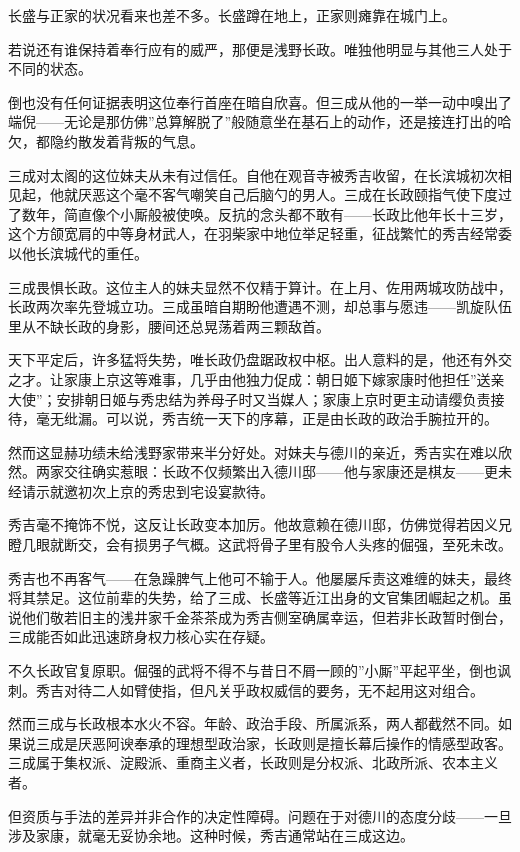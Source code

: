 \documentclass[
]{book}
\begin{document}
长盛与正家的状况看来也差不多。长盛蹲在地上，正家则瘫靠在城门上。

若说还有谁保持着奉行应有的威严，那便是浅野长政。唯独他明显与其他三人处于不同的状态。

倒也没有任何证据表明这位奉行首座在暗自欣喜。但三成从他的一举一动中嗅出了端倪------无论是那仿佛''总算解脱了''般随意坐在基石上的动作，还是接连打出的哈欠，都隐约散发着背叛的气息。

三成对太阁的这位妹夫从未有过信任。自他在观音寺被秀吉收留，在长滨城初次相见起，他就厌恶这个毫不客气嘲笑自己后脑勺的男人。三成在长政颐指气使下度过了数年，简直像个小厮般被使唤。反抗的念头都不敢有------长政比他年长十三岁，这个方颌宽肩的中等身材武人，在羽柴家中地位举足轻重，征战繁忙的秀吉经常委以他长滨城代的重任。

三成畏惧长政。这位主人的妹夫显然不仅精于算计。在上月、佐用两城攻防战中，长政两次率先登城立功。三成虽暗自期盼他遭遇不测，却总事与愿违------凯旋队伍里从不缺长政的身影，腰间还总晃荡着两三颗敌首。

天下平定后，许多猛将失势，唯长政仍盘踞政权中枢。出人意料的是，他还有外交之才。让家康上京这等难事，几乎由他独力促成：朝日姬下嫁家康时他担任''送亲大使''；安排朝日姬与秀忠结为养母子时又当媒人；家康上京时更主动请缨负责接待，毫无纰漏。可以说，秀吉统一天下的序幕，正是由长政的政治手腕拉开的。

然而这显赫功绩未给浅野家带来半分好处。对妹夫与德川的亲近，秀吉实在难以欣然。两家交往确实惹眼：长政不仅频繁出入德川邸------他与家康还是棋友------更未经请示就邀初次上京的秀忠到宅设宴款待。

秀吉毫不掩饰不悦，这反让长政变本加厉。他故意赖在德川邸，仿佛觉得若因义兄瞪几眼就断交，会有损男子气概。这武将骨子里有股令人头疼的倔强，至死未改。

秀吉也不再客气------在急躁脾气上他可不输于人。他屡屡斥责这难缠的妹夫，最终将其禁足。这位前辈的失势，给了三成、长盛等近江出身的文官集团崛起之机。虽说他们敬若旧主的浅井家千金茶茶成为秀吉侧室确属幸运，但若非长政暂时倒台，三成能否如此迅速跻身权力核心实在存疑。

不久长政官复原职。倔强的武将不得不与昔日不屑一顾的''小厮''平起平坐，倒也讽刺。秀吉对待二人如臂使指，但凡关乎政权威信的要务，无不起用这对组合。

然而三成与长政根本水火不容。年龄、政治手段、所属派系，两人都截然不同。如果说三成是厌恶阿谀奉承的理想型政治家，长政则是擅长幕后操作的情感型政客。三成属于集权派、淀殿派、重商主义者，长政则是分权派、北政所派、农本主义者。

但资质与手法的差异并非合作的决定性障碍。问题在于对德川的态度分歧------一旦涉及家康，就毫无妥协余地。这种时候，秀吉通常站在三成这边。
\end{document}
